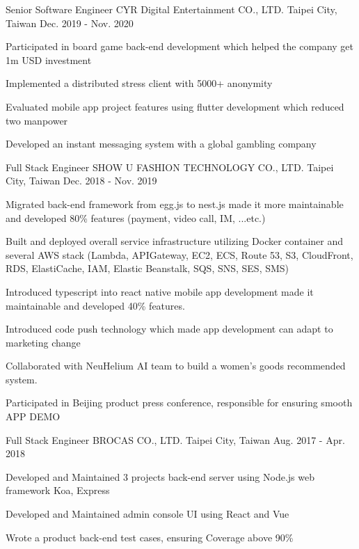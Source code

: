 \begin{cventries}
  \cventry
    {Senior Software Engineer} %
    {CYR Digital Entertainment CO., LTD.} %
    {Taipei City, Taiwan} %
    {Dec. 2019 - Nov. 2020} %
    {
      \begin{cvitems} %
        \item {Participated in board game back-end development which helped the company get 1m USD investment}
        \item {Implemented a distributed stress client with 5000+ anonymity}
        \item {Evaluated mobile app project features using flutter development which reduced two manpower}
        \item {Developed an instant messaging system with a global gambling company}
      \end{cvitems}
    }

  \cventry
    {Full Stack Engineer} %
    {SHOW U FASHION TECHNOLOGY CO., LTD.} %
    {Taipei City, Taiwan} %
    {Dec. 2018 - Nov. 2019} %
    {
      \begin{cvitems} %
        \item {Migrated back-end framework from egg.js to nest.js made it more maintainable and developed 80\% features (payment, video call, IM, ...etc.)}
        \item {Built and deployed overall service infrastructure utilizing Docker container and several AWS stack (Lambda, APIGateway, EC2, ECS, Route 53, S3, CloudFront, RDS, ElastiCache, IAM, Elastic Beanstalk, SQS, SNS, SES, SMS)}
        \item {Introduced typescript into react native mobile app development made it maintainable and developed 40\% features. }
        \item {Introduced code push technology which made app development can adapt to marketing change}
        \item {Collaborated with NeuHelium AI team to build a women's goods recommended system.}
        \item {Participated in Beijing product press conference, responsible for ensuring smooth APP DEMO}
      \end{cvitems}
    }

  \cventry
    {Full Stack Engineer} %
    {BROCAS CO., LTD.} %
    {Taipei City, Taiwan} %
    {Aug. 2017 - Apr. 2018} %
    {
      \begin{cvitems} %
        \item {Developed and Maintained 3 projects back-end server using Node.js web framework Koa, Express}
        \item {Developed and Maintained admin console UI using React and Vue}
        \item {Wrote a product back-end test cases, ensuring Coverage above 90\%}
      \end{cvitems}
    }


\end{cventries}
